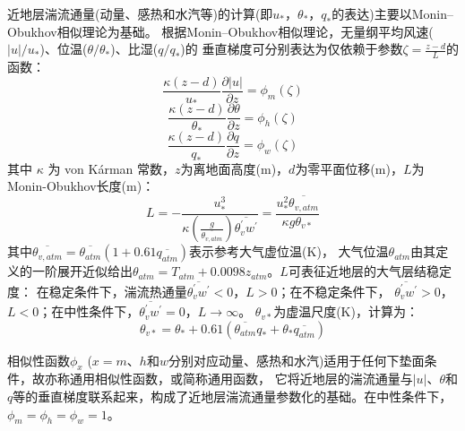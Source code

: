 近地层湍流通量(动量、感热和水汽等)的计算(即$u_\ast$，$\theta_\ast$，$q_\ast$的表达)主要以Monin--Obukhov相似理论为基础。
根据Monin--Obukhov相似理论，无量纲平均风速($\left|u\right|/u_\ast$)、位温($\theta/\theta_\ast$)、比湿($q/q_\ast$)的
垂直梯度可分别表达为仅依赖于参数$\zeta=\frac{z-d}{L}$的函数：
\begin{equation}\label{kz_u}
\frac{\kappa (z-d)}{u_{*}} \frac{\partial|u|}{\partial z}=\phi_{m}(\zeta)
\end{equation}
\begin{equation}\label{kz_theta}
\frac{\kappa (z-d)}{\theta_{*}} \frac{\partial \theta}{\partial z}=\phi_{h}(\zeta)
\end{equation}
\begin{equation}\label{kz_q}
\frac{\kappa (z-d)}{q_{*}} \frac{\partial q}{\partial z}=\phi_{w}(\zeta)
\end{equation}
其中 $\kappa$ 为 von K\'arman 常数，$z$为离地面高度(m)，$d$为零平面位移(m)，$L$为Monin-Obukhov长度(m)：
\begin{equation}\label{ObukL}
L=-\frac{u_{*}^{3}}{\kappa \left(\frac{g}{\overline{\theta_{v, atm}}}\right) \overline{\theta_{v}^{\prime} w^{\prime}}}=\frac{u_{*}^{2} \overline{\theta_{v, atm}}}{\kappa g \theta_{v *}}
\end{equation}
其中$\overline{\theta_{v,atm}}=\overline{\theta_{atm}}(1+0.61\overline{q_{atm}})$表示参考大气虚位温(K)，
 大气位温$\theta_{atm}$由其定义的一阶展开近似给出$\theta_{atm}=T_{atm}+0.0098z_{atm}$。$L$可表征近地层的大气层结稳定度：
 在稳定条件下，湍流热通量$\overline{\theta_v^\prime w^\prime}<0$，$L>0$；在不稳定条件下，
 $\overline{\theta_v^\prime w^\prime}>0$，$L<0$；在中性条件下，$\overline{\theta_v^\prime w^\prime}=0$，$L\rightarrow\infty$。
$\theta_{v\ast}$为虚温尺度(K)，计算为：
\begin{equation}\label{thvstar}
\theta_{v\ast}=\theta_\ast+0.61(\overline{\theta_{atm}}q_\ast + \theta_\ast\overline{q_{atm}})
\end{equation}

相似性函数$\phi_x$ ($x=m$、$h$和$w$分别对应动量、感热和水汽)适用于任何下垫面条件，故亦称通用相似性函数，或简称通用函数，
它将近地层的湍流通量与$\left|u\right|$、$\theta$和$q$等的垂直梯度联系起来，构成了近地层湍流通量参数化的基础。在中性条件下，$\phi_m=\phi_h=\phi_w=1$。



